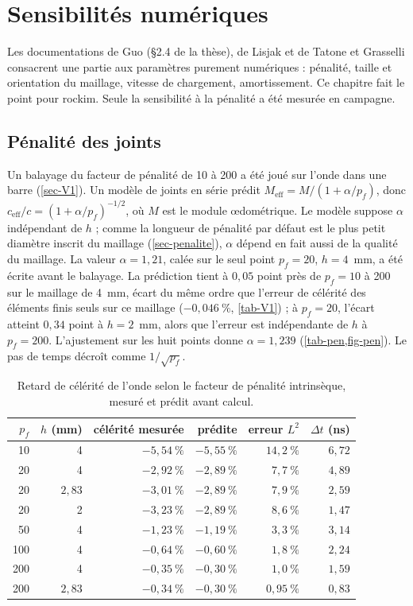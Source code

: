 \section{Sensibilités numériques}
\label{sec-sensibilites}

Les documentations de Guo (§{2.4} de la thèse), de Lisjak et de Tatone et Grasselli consacrent une partie aux paramètres purement numériques : pénalité, taille et orientation du maillage, vitesse de chargement, amortissement. Ce chapitre fait le point pour rockim. Seule la sensibilité à la pénalité a été mesurée en campagne.

\subsection{Pénalité des joints}

Un balayage du facteur de pénalité de 10 à 200 a été joué sur l'onde dans une barre (\cref{sec-V1}). Un modèle de joints en série prédit $M_\text{eff} = M/(1 + \alpha/p_f)$, donc $c_\text{eff}/c = (1 + \alpha/p_f)^{-1/2}$, où $M$ est le module œdométrique. Le modèle suppose $\alpha$ indépendant de $h$ ; comme la longueur de pénalité par défaut est le plus petit diamètre inscrit du maillage (\cref{sec-penalite}), $\alpha$ dépend en fait aussi de la qualité du maillage. La valeur $\alpha = 1{,}21$, calée sur le seul point $p_f = 20$, $h = 4$~mm, a été écrite avant le balayage. La prédiction tient à $0{,}05$ point près de $p_f = 10$ à 200 sur le maillage de 4~mm, écart du même ordre que l'erreur de célérité des éléments finis seuls sur ce maillage ($-0{,}046~\%$, \cref{tab-V1}) ; à $p_f = 20$, l'écart atteint $0{,}34$ point à $h = 2$~mm, alors que l'erreur est indépendante de $h$ à $p_f = 200$. L'ajustement sur les huit points donne $\alpha = 1{,}239$ (\cref{tab-pen,fig-pen}). Le pas de temps décroît comme $1/\sqrt{p_f}$.

\begin{table}[htbp]
\centering
\caption{Retard de célérité de l'onde selon le facteur de pénalité intrinsèque, mesuré et prédit avant calcul.}
\label{tab-pen}
\small
\begin{tabular}{@{}rrrrrr@{}}
\toprule
$p_f$ & $h$ (mm) & célérité mesurée & prédite & erreur $L^2$ & $\Delta t$ (ns) \\
\midrule
10 & 4 & $-5{,}54~\%$ & $-5{,}55~\%$ & $14{,}2~\%$ & $6{,}72$ \\
20 & 4 & $-2{,}92~\%$ & $-2{,}89~\%$ & $7{,}7~\%$ & $4{,}89$ \\
20 & $2{,}83$ & $-3{,}01~\%$ & $-2{,}89~\%$ & $7{,}9~\%$ & $2{,}59$ \\
20 & 2 & $-3{,}23~\%$ & $-2{,}89~\%$ & $8{,}6~\%$ & $1{,}47$ \\
50 & 4 & $-1{,}23~\%$ & $-1{,}19~\%$ & $3{,}3~\%$ & $3{,}14$ \\
100 & 4 & $-0{,}64~\%$ & $-0{,}60~\%$ & $1{,}8~\%$ & $2{,}24$ \\
200 & 4 & $-0{,}35~\%$ & $-0{,}30~\%$ & $1{,}0~\%$ & $1{,}59$ \\
200 & $2{,}83$ & $-0{,}34~\%$ & $-0{,}30~\%$ & $0{,}95~\%$ & $0{,}83$ \\
\bottomrule
\end{tabular}
\end{table}

